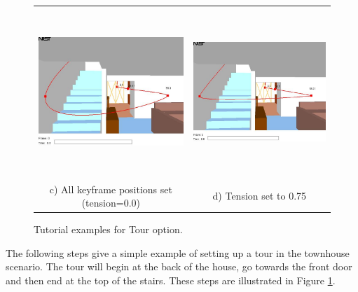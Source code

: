 \documentclass[11pt,twoside]{book}
\newcommand{\figoptions}{hbp}
\newcommand{\figheightA}{2.5in}
\begin{document}
\begin{figure}[\figoptions]
\begin{center}
\begin{tabular}{cc}
\includegraphics[height=\figheightA]{figures/figTOUR_3}&
\includegraphics[height=\figheightA]{figures/figTOUR_4}\\
c) All keyframe positions set (tension=0.0)&d) Tension set to 0.75
\end{tabular}
\end{center}
\caption [Tutorial examples for Tour option.] {Tutorial examples for Tour option.}
\label{figTutorial}%
\end{figure}


The following steps give a simple example of setting up a tour in the
townhouse scenario.  The tour will begin at the back of the house,
go towards the front door and then end at the top of the stairs.
These steps are illustrated in Figure \ref{figTutorial}.
\end{document}
